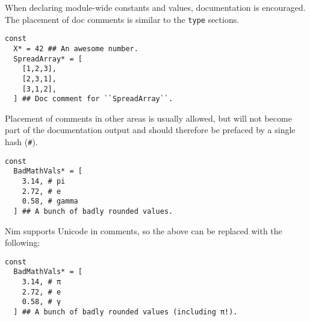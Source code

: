When declaring module-wide constants and values, documentation is
encouraged. The placement of doc comments is similar to the
\texttt{type} sections.

\begin{verbatim}
const
  X* = 42 ## An awesome number.
  SpreadArray* = [
    [1,2,3],
    [2,3,1],
    [3,1,2],
  ] ## Doc comment for ``SpreadArray``.
\end{verbatim}

Placement of comments in other areas is usually allowed, but will not
become part of the documentation output and should therefore be prefaced
by a single hash (\texttt{\#}).

\begin{verbatim}
const
  BadMathVals* = [
    3.14, # pi
    2.72, # e
    0.58, # gamma
  ] ## A bunch of badly rounded values.
\end{verbatim}

Nim supports Unicode in comments, so the above can be replaced with the
following:

\begin{verbatim}
const
  BadMathVals* = [
    3.14, # π
    2.72, # e
    0.58, # γ
  ] ## A bunch of badly rounded values (including π!).
\end{verbatim}
